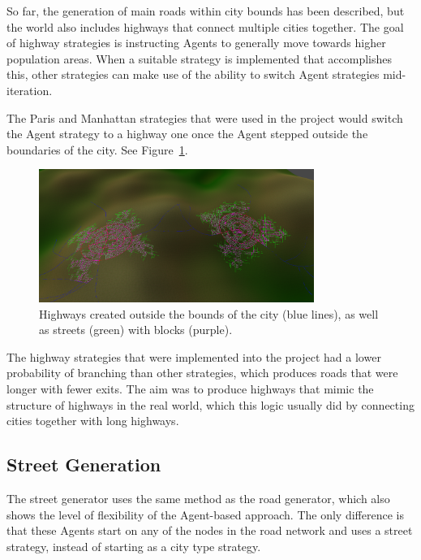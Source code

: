So far, the generation of main roads within city bounds has been described, but the world also includes highways that connect multiple cities together.
The goal of highway strategies is instructing Agents to generally move towards higher population areas.
When a suitable strategy is implemented that accomplishes this, other strategies can make use of the ability to switch Agent strategies mid-iteration.

The Paris and Manhattan strategies that were used in the project would switch the Agent strategy to a highway one once the Agent stepped outside the boundaries of the city.
See Figure~\ref{fig:road_highways}.

\begin{figure}[H]
  \centering

  \includegraphics[width=0.8\textwidth]{figure/road_highways.png}
  \caption{Highways created outside the bounds of the city (blue lines), as well as streets (green) with blocks (purple).}

  \label{fig:road_highways}
\end{figure}

The highway strategies that were implemented into the project had a lower probability of branching than other strategies, which produces roads that were longer with fewer exits.
The aim was to produce highways that mimic the structure of highways in the real world, which this logic usually did by connecting cities together with long highways.

\subsection{Street Generation}
The street generator uses the same method as the road generator, which also shows the level of flexibility of the Agent-based approach.
The only difference is that these Agents start on any of the nodes in the road network and uses a street strategy, instead of starting as a city type strategy.

